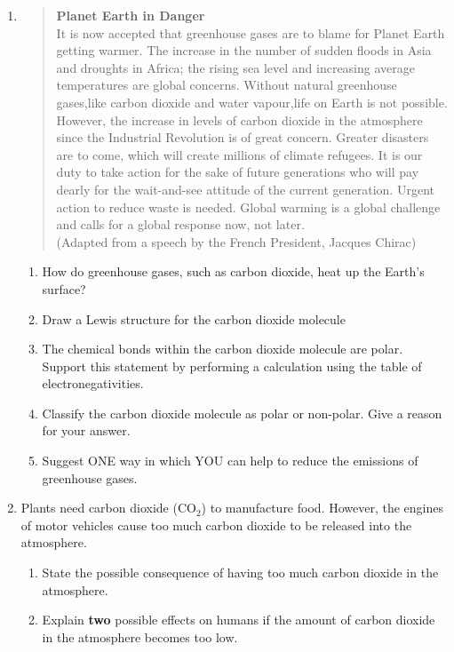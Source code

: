 \begin{eocexercises}{}
\begin{enumerate}
\item{
\begin{quote}
\textbf{Planet Earth in Danger}\\ It is now accepted that greenhouse gases are to blame for Planet Earth getting warmer. The increase in the number of sudden floods in Asia and droughts in Africa; the rising sea level and increasing average temperatures are global concerns. Without natural greenhouse gases,like carbon dioxide and water vapour,life on Earth is not possible. However, the increase in levels of carbon dioxide in the atmosphere since the Industrial Revolution is of great concern. Greater disasters are to come, which will create millions of climate refugees. It is our duty to take action for the sake of future generations who will pay dearly for the wait-and-see attitude of the current generation. Urgent action to reduce waste is needed. Global warming is a global challenge and calls for a global response now, not later.\\ (Adapted from a speech by the French President, Jacques Chirac)\\

\end{quote}

\begin{enumerate}
\item How do greenhouse gases, such as carbon dioxide, heat up the Earth's surface?\\
\item Draw a Lewis structure for the carbon dioxide molecule\\
\item The chemical bonds within the carbon dioxide molecule are polar. Support this statement by performing a calculation using the table of electronegativities.\\
\item Classify the carbon dioxide molecule as polar or non-polar. Give a reason for your answer.\\
\item Suggest ONE way in which YOU can help to reduce the emissions of greenhouse gases.\\ \end{enumerate}

}

\item{Plants need carbon dioxide (CO$_{2}$) to manufacture food. However, the engines of motor vehicles cause too much carbon dioxide to be released into the atmosphere.}
\begin{enumerate}
\item{State the possible consequence of having too much carbon dioxide in the atmosphere.}
\item{Explain \textbf{two} possible effects on humans if the amount of carbon dioxide in the atmosphere becomes too low.}
\end{enumerate}


\end{enumerate}
\end{eocexercises}
